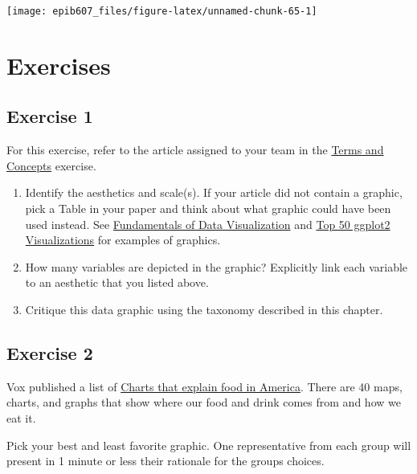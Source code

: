 \documentclass[]{book}
\providecommand{\tightlist}{%
  \setlength{\itemsep}{0pt}\setlength{\parskip}{0pt}}
\providecommand{\tightlist}{%
  \setlength{\itemsep}{0pt}\setlength{\parskip}{0pt}}
\theoremstyle{definition}
\theoremstyle{definition}
\theoremstyle{definition}
\theoremstyle{remark}
\begin{document}
\begin{center}\texttt{[image: epib607\_files/figure-latex/unnamed-chunk-65-1]} \end{center}

\section{Exercises}\label{exercises}

\subsection{Exercise 1}\label{exercise-1}

For this exercise, refer to the article assigned to your team in the
\href{https://sahirbhatnagar.com/EPIB607/terms-and-concepts.html}{Terms
and Concepts} exercise.

\begin{enumerate}
\def\labelenumi{\arabic{enumi}.}
\tightlist
\item
  Identify the aesthetics and scale(s). If your article did not contain
  a graphic, pick a Table in your paper and think about what graphic
  could have been used instead. See
  \href{https://serialmentor.com/dataviz/directory-of-visualizations.html}{Fundamentals
  of Data Visualization} and
  \href{http://r-statistics.co/Top50-Ggplot2-Visualizations-MasterList-R-Code.html\#1.\%20Correlation}{Top
  50 ggplot2 Visualizations} for examples of graphics.
\item
  How many variables are depicted in the graphic? Explicitly link each
  variable to an aesthetic that you listed above.
\item
  Critique this data graphic using the taxonomy described in this
  chapter.
\end{enumerate}

\subsection{Exercise 2}\label{exercise-2}

Vox published a list of
\href{http://www.vox.com/a/explain-food-america}{Charts that explain
food in America}. There are 40 maps, charts, and graphs that show where
our food and drink comes from and how we eat it.

Pick your best and least favorite graphic. One representative from each
group will present in 1 minute or less their rationale for the groups
choices.

\appendix
\end{document}
